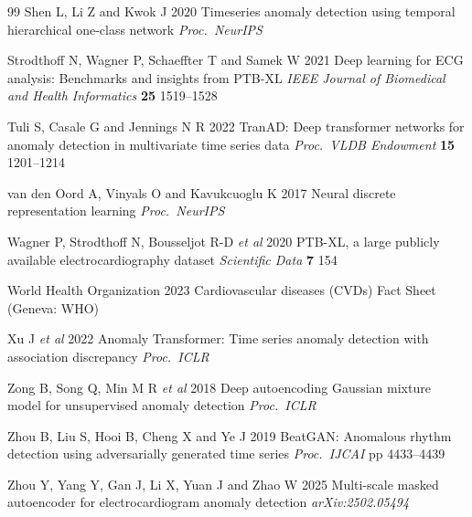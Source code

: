 \documentclass{iopjournal}
\begin{document}
\begin{thebibliography}{99}
 Shen L, Li Z and Kwok J 2020 Timeseries anomaly detection using temporal hierarchical one-class network \emph{Proc.\ NeurIPS}

 Strodthoff N, Wagner P, Schaeffter T and Samek W 2021 Deep learning for ECG analysis: Benchmarks and insights from PTB-XL \emph{IEEE Journal of Biomedical and Health Informatics} \textbf{25} 1519--1528

 Tuli S, Casale G and Jennings N R 2022 TranAD: Deep transformer networks for anomaly detection in multivariate time series data \emph{Proc.\ VLDB Endowment} \textbf{15} 1201--1214

 van den Oord A, Vinyals O and Kavukcuoglu K 2017 Neural discrete representation learning \emph{Proc.\ NeurIPS}

 Wagner P, Strodthoff N, Bousseljot R-D \emph{et al} 2020 PTB-XL, a large publicly available electrocardiography dataset \emph{Scientific Data} \textbf{7} 154

 World Health Organization 2023 Cardiovascular diseases (CVDs) Fact Sheet (Geneva: WHO)

 Xu J \emph{et al} 2022 Anomaly Transformer: Time series anomaly detection with association discrepancy \emph{Proc.\ ICLR}

 Zong B, Song Q, Min M R \emph{et al} 2018 Deep autoencoding Gaussian mixture model for unsupervised anomaly detection \emph{Proc.\ ICLR}

 Zhou B, Liu S, Hooi B, Cheng X and Ye J 2019 BeatGAN: Anomalous rhythm detection using adversarially generated time series \emph{Proc.\ IJCAI} pp 4433--4439

 Zhou Y, Yang Y, Gan J, Li X, Yuan J and Zhao W 2025 Multi-scale masked autoencoder for electrocardiogram anomaly detection \emph{arXiv:2502.05494}

\end{thebibliography}
\end{document}
